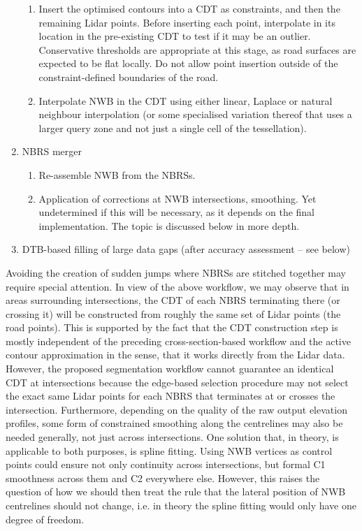 \begin{enumerate}
\begin{enumerate}
            \item Insert the optimised contours into a CDT as constraints, and then the remaining Lidar points. Before inserting each point, interpolate in its location in the pre-existing CDT to test if it may be an outlier. Conservative thresholds are appropriate at this stage, as road surfaces are expected to be flat locally. Do not allow point insertion outside of the constraint-defined boundaries of the road.
            \item Interpolate NWB in the CDT using either linear, Laplace or natural neighbour interpolation (or some specialised variation thereof that uses a larger query zone and not just a single cell of the tessellation).
        \end{enumerate}
    \item NBRS merger
        \begin{enumerate}
            \item Re-assemble NWB from the NBRSs.
            \item Application of corrections at NWB intersections, smoothing. Yet undetermined if this will be necessary, as it depends on the final implementation. The topic is discussed below in more depth.
        \end{enumerate}
    \item DTB-based filling of large data gaps (after accuracy assessment – see below)
\end{enumerate}

Avoiding the creation of sudden jumps where NBRSs are stitched together may require special attention. In view of the above workflow, we may observe that in areas surrounding intersections, the CDT of each NBRS terminating there (or crossing it) will be constructed from roughly the same set of Lidar points (the road points). This is supported by the fact that the CDT construction step is mostly independent of the preceding cross-section-based workflow and the active contour approximation in the sense, that it works directly from the Lidar data. However, the proposed segmentation workflow cannot guarantee an identical CDT at intersections because the edge-based selection procedure may not select the exact same Lidar points for each NBRS that terminates at or crosses the intersection. Furthermore, depending on the quality of the raw output elevation profiles, some form of constrained smoothing along the centrelines may also be needed generally, not just across intersections. One solution that, in theory, is applicable to both purposes, is spline fitting. Using NWB vertices as control points could ensure not only continuity across intersections, but formal C1 smoothness across them and C2 everywhere else. However, this raises the question of how we should then treat the rule that the lateral position of NWB centrelines should not change, i.e. in theory the spline fitting would only have one degree of freedom.

